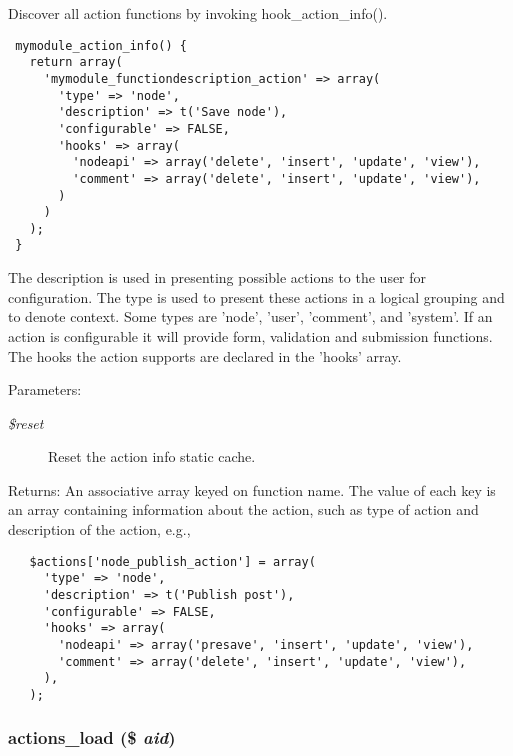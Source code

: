 Discover all action functions by invoking hook\_\-action\_\-info().



\begin{Code}\begin{verbatim} mymodule_action_info() {
   return array(
     'mymodule_functiondescription_action' => array(
       'type' => 'node',
       'description' => t('Save node'),
       'configurable' => FALSE,
       'hooks' => array(
         'nodeapi' => array('delete', 'insert', 'update', 'view'),
         'comment' => array('delete', 'insert', 'update', 'view'),
       )
     )
   );
 }
\end{verbatim}
\end{Code}



The description is used in presenting possible actions to the user for configuration. The type is used to present these actions in a logical grouping and to denote context. Some types are 'node', 'user', 'comment', and 'system'. If an action is configurable it will provide form, validation and submission functions. The hooks the action supports are declared in the 'hooks' array.

\begin{Desc}
\item[Parameters:]
\begin{description}
\item[{\em \$reset}]Reset the action info static cache.\end{description}
\end{Desc}
\begin{Desc}
\item[Returns:]An associative array keyed on function name. The value of each key is an array containing information about the action, such as type of action and description of the action, e.g.,\end{Desc}


\begin{Code}\begin{verbatim}   $actions['node_publish_action'] = array(
     'type' => 'node',
     'description' => t('Publish post'),
     'configurable' => FALSE,
     'hooks' => array(
       'nodeapi' => array('presave', 'insert', 'update', 'view'),
       'comment' => array('delete', 'insert', 'update', 'view'),
     ),
   );
\end{verbatim}
\end{Code}

 \hypertarget{actions_8inc_1e953639945d342b20fe51b8d21095cc}{
\subsubsection[{actions\_\-load}]{\setlength{\rightskip}{0pt plus 5cm}actions\_\-load (\$ {\em aid})}}
\label{actions_8inc_1e953639945d342b20fe51b8d21095cc}


